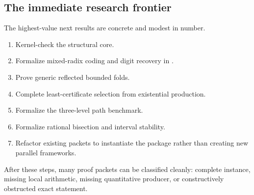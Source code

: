 \subsection{The immediate research frontier}

The highest-value next results are concrete and modest in number.

\begin{enumerate}
\item Kernel-check the structural core.
\item Formalize mixed-radix coding and digit recovery in
.
\item Prove generic reflected bounded folds.
\item Complete least-certificate selection from existential production.
\item Formalize the three-level path benchmark.
\item Formalize rational bisection and interval stability.
\item Refactor existing packets to instantiate the package rather than creating
new parallel frameworks.
\end{enumerate}

After these steps, many proof packets can be classified cleanly: complete
instance, missing local arithmetic, missing quantitative producer, or
constructively obstructed exact statement.
